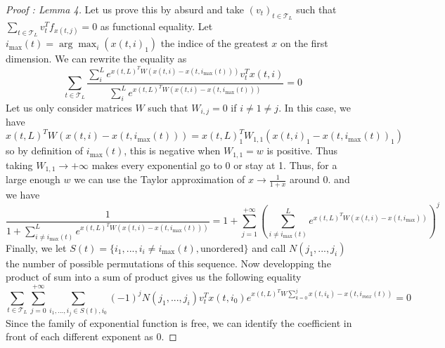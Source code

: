 \documentclass{article}
\begin{document}
\begin{proof}[Proof : Lemma 4]
    Let us prove this by absurd and take $(v_t)_{t\in\mathcal{T}_L}$ such that $\sum_{t\in\mathcal{T}_L}v_t^Tf_{x(t,j)} = 0$ 
    as functional equality. Let $i_{\max}(t) = \arg\max_i(x(t,i)_1)$ the indice of the greatest $x$ on the first dimension.
    We can rewrite the equality as 
    \[\sum_{t\in\mathcal{T}_L}\frac{\sum_{i}^Le^{x(t,L)^TW(x(t,i)-x(t,i_{\max}(t)))}v_t^Tx(t,i)}{\sum_{i}^Le^{x(t,L)^TW(x(t,i)-x(t,i_{\max}(t)))}} = 0\]
    Let us only consider matrices $W$ such that $W_{i,j} = 0$ if $i\neq 1\neq j$. In this case, we have 
    $x(t,L)^TW(x(t,i)-x(t,i_{\max}(t))) = x(t,L)_1^TW_{1,1}(x(t,i)_1-x(t,i_{\max}(t))_1)$ so by definition of $i_{\max}(t)$, this is negative 
    when $W_{1, 1} = w$ is positive. Thus taking $W_{1, 1} \rightarrow +\infty$ makes every exponential go to 0 or stay at 1. Thus,
    for a large enough $w$ we can use the Taylor approximation of $x\rightarrow \frac{1}{1+x}$ around 0. and we have 
    \[\frac{1}{1+\sum_{i\neq i_{\max}(t)}^Le^{x(t,L)^TW(x(t,i)-x(t,i_{\max}(t)))}} = 1+\sum_{j=1}^{+\infty}\left(\sum_{i\neq i_{\max}(t)}^Le^{x(t,L)^TW(x(t,i)-x(t,i_{\max}))}\right)^j\]
    Finally, we let $S(t) = \{i_1, ..., i_i \neq i_{\max}(t), \text{unordered}\}$ and call $N(j_1, ..., j_i)$ the number of 
    possible permutations of this sequence. Now developping the product of sum into a sum of product gives us the following equality
    \[\sum_{t\in\mathcal{T}_L}\sum_{j=0}^{+\infty}\sum_{i_1, ..., i_j \in S(t), i_0}(-1)^jN(j_1, ..., j_i)v_t^Tx(t, i_0)e^{x(t,L)^TW\sum_{k=0}^{j}x(t, i_k) - x(t, i_{max}(t))} = 0\]
    Since the family of exponential function is free, we can identify the coefficient in front of each different exponent as 0.
    \bigbreak


\end{proof}
\end{document}
